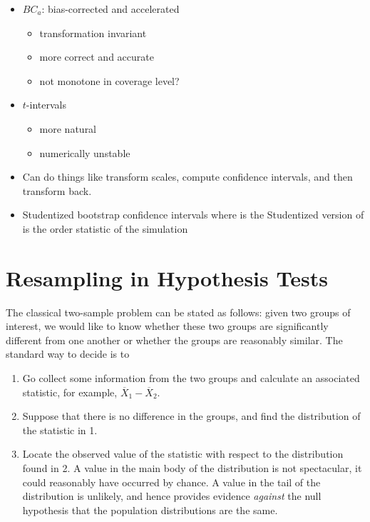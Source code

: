 \documentclass[captions=tableheading]{scrbook}
\begin{document}
\begin{itemize}
\item \(BC_{a}\): bias-corrected and accelerated
\begin{itemize}
\item transformation invariant
\item more correct and accurate
\item not monotone in coverage level?
\end{itemize}
\item \(t\)-intervals
\begin{itemize}
\item more natural
\item numerically unstable
\end{itemize}
\item Can do things like transform scales, compute confidence intervals, and then transform back.
\item Studentized bootstrap confidence intervals where is the Studentized version of is the  order statistic of the simulation
\end{itemize}
\section{Resampling in Hypothesis Tests}
\label{sec-13-4}

\label{sec:Resampling-in-Hypothesis}

The classical two-sample problem can be stated as follows: given two groups of interest, we would like to know whether these two groups are significantly different from one another or whether the groups are reasonably similar. The standard way to decide is to 
\begin{enumerate}
\item Go collect some information from the two groups and calculate an associated statistic, for example, \(\overline{X}_{1}-\overline{X}_{2}\).
\item Suppose that there is no difference in the groups, and find the distribution of the statistic in 1.
\item Locate the observed value of the statistic with respect to the distribution found in 2. A value in the main body of the distribution is not spectacular, it could reasonably have occurred by chance. A value in the tail of the distribution is unlikely, and hence provides evidence \emph{against} the null hypothesis that the population distributions are the same.
\end{enumerate}
\end{document}

